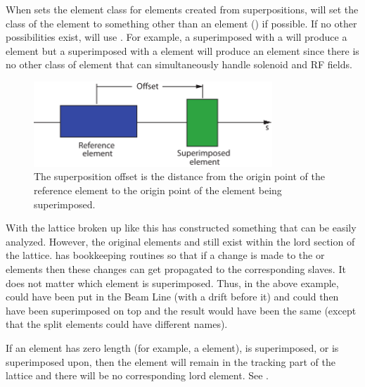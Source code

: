 When \bmad sets the element class for elements created from
superpositions, \bmad will set the class of the element to something
other than an  element () if
possible. If no other possibilities exist, \bmad will use
. For example, a  superimposed with a
 will produce a  element but a 
superimposed with a  element will produce an
 element since there is no other class of element that
can simultaneously handle solenoid and RF fields.

  \begin{figure}[tb]
  \centering 
  \includegraphics[width=0.8\textwidth]{superimpose.pdf} 
  \caption[Superposition Offset.]{
The superposition offset is the distance from the origin point of the
reference element to the origin point of the element being
superimposed.
  }
  \label{f:superimpose}
  \end{figure}

With the lattice broken up like this \bmad has constructed something
that can be easily analyzed. However, the original elements  and
 still exist within the lord section of the lattice. \bmad has
bookkeeping routines so that if a change is made to the  or
 elements then these changes can get propagated to the
corresponding slaves. It does not matter which element is
superimposed. Thus, in the above example,  could have been put
in the Beam Line (with a drift before it) and  could then have
been superimposed on top and the result would have been the same
(except that the split elements could have different names).

If an element has zero length (for example, a
 element), is superimposed, or is superimposed upon, then the
element will remain in the tracking part of the lattice and there will be
no corresponding lord element. See .
 
